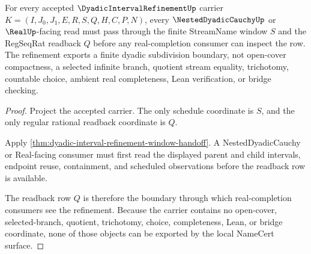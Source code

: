 \begin{theorem}
\label{thm:dyadic-interval-refinement-real-boundary}
For every accepted $\DyadicIntervalRefinementUp$ carrier $K=(I,J_0,J_1,E,R,S,Q,H,C,P,N)$, every $\NestedDyadicCauchyUp$ or $\RealUp$-facing read must pass through the finite StreamName window $S$ and the RegSeqRat readback $Q$ before any real-completion consumer can inspect the row. The refinement exports a finite dyadic subdivision boundary, not open-cover compactness, a selected infinite branch, quotient stream equality, trichotomy, countable choice, ambient real completeness, Lean verification, or bridge checking.
\end{theorem}
\begin{proof}
Project the accepted carrier. The only schedule coordinate is $S$, and the only regular rational readback coordinate is $Q$.

Apply \autoref{thm:dyadic-interval-refinement-window-handoff}. A NestedDyadicCauchy or Real-facing consumer must first read the displayed parent and child intervals, endpoint reuse, containment, and scheduled observations before the readback row is available.

The readback row $Q$ is therefore the boundary through which real-completion consumers see the refinement. Because the carrier contains no open-cover, selected-branch, quotient, trichotomy, choice, completeness, Lean, or bridge coordinate, none of those objects can be exported by the local NameCert surface.
\end{proof}


\begin{closurestatus}{\DyadicIntervalRefinementUp}
  \theoryclosure{\seedClosure}
  \formalstatus{\unformalizedV}
\end{closurestatus}
